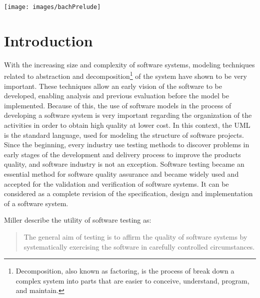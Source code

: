 \ifx\neat\undefined
\begin{savequote}[10pc]
{%
\parindent 0pt
\ifx\preLilyPondExample \undefined
\else
  \expandafter\preLilyPondExample
\fi
\def\lilypondbook{}%
\texttt{[image: images/bachPrelude]}
\ifx\postLilyPondExample \undefined
\else
  \expandafter\postLilyPondExample
\fi
}
\end{savequote}
\fi
\chapter{Introduction}
\minitoc

With the increasing size and complexity of software systems, modeling techniques related to abstraction
and decomposition\footnote{Decomposition, also known as factoring, is the process of break down a complex system
into parts that are easier to conceive, understand, program, and maintain.}\cite{struct-analy} of the system have
shown to be very important\cite{dicsbuchs06}.
These techniques allow an early vision of the software to be developed, enabling analysis and previous evaluation before
the model be implemented.
Because of this, the use of software models in the process of developing a software system is very important regarding
the organization of the activities in order to obtain high quality at lower cost.
In this context, the \ac{UML} is the standard language, used for modeling the structure of software projects.\\

Since the beginning, every industry use testing methods to discover problems in early stages of the development and delivery
process to improve the products quality, and software industry is not an exception.
Software testing became an essential method for software quality assurance and became widely used
and accepted for the validation and verification of software systems.
It can be considered as a complete revision of the specification, design and implementation of a software system.

Miller\cite{miller} describe the utility of software testing as:

\begin{quotation}
The general aim of testing is to affirm the quality of software systems by systematically
exercising the software in carefully controlled circumstances.
\end{quotation}

